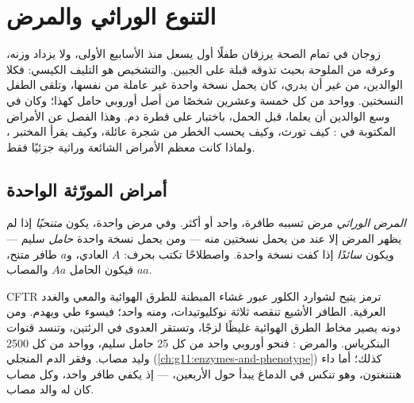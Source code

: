 \chapter{التنوع الوراثي والمرض}\label{ch:g11:genes-and-disease}

زوجان في تمام الصحة يرزقان طفلًا أول يسعل منذ الأسابيع الأولى، ولا
يزداد وزنه، وعرقه من الملوحة بحيث تذوقه قبلة على الجبين. والتشخيص هو
التليف الكيسي: فكلا الوالدين، من غير أن يدري، كان يحمل نسخة واحدة غير
عاملة من  نفسها، وتلقى الطفل النسختين. وواحد من كل خمسة وعشرين
شخصًا من أصل أوروبي حامل كهذا؛ وكان في وسع الوالدين أن يعلما، قبل
الحمل، باختبار على قطرة دم. وهذا الفصل عن الأمراض المكتوبة في
: كيف تورث، وكيف يحسب الخطر من شجرة عائلة، وكيف يقرأ المختبر
، ولماذا كانت معظم الأمراض الشائعة وراثية جزئيًا فقط.

\section{أمراض المورّثة الواحدة}

\begin{definition}\label{def:g11:genes-and-disease:genetic}
\emph{المرض الوراثي} مرض تسببه  طافرة، واحد أو
أكثر. وفي مرض  واحدة، يكون  \emph{متنحيًا} إذا
لم يظهر المرض إلا عند من يحمل نسختين منه --- ومن يحمل نسخة واحدة
\emph{حامل} سليم --- ويكون \emph{سائدًا} إذا
كفت نسخة واحدة. واصطلاحًا تكتب   بحرف: $A$ 
العادي، و$a$  طافر متنح، فيكون الحامل $Aa$ والمصاب $aa$.
\end{definition}

\begin{example}\label{ex:g11:genes-and-disease:cf}
 CFTR ترمز  يتيح لشوارد الكلور عبور غشاء  المبطنة
للطرق الهوائية والمعي والغدد العرقية.  الطافر الأشيع تنقصه
ثلاثة نوكليوتيدات، ومنه  واحد؛ فيسوء طي  ويهدم. ومن
دونه يصير مخاط الطرق الهوائية غليظًا لزجًا، وتستقر العدوى في الرئتين،
وتنسد قنوات البنكرياس. والمرض : فنحو أوروبي واحد من كل 25 حامل
سليم، وواحد من كل 2500 وليد مصاب. وفقر الدم المنجلي
(\cref{ch:g11:enzymes-and-phenotype})  كذلك؛ أما داء هنتنغتون،
وهو تنكس في الدماغ يبدأ حول الأربعين،  --- إذ يكفي  طافر
واحد، وكل مصاب كان له والد مصاب.
\end{example}

